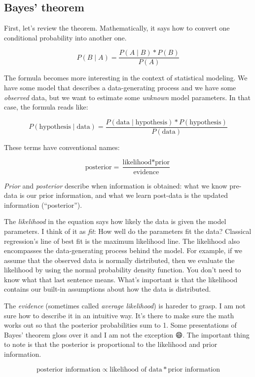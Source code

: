 \documentclass[
  12pt,
]{book}
\begin{document}
\hypertarget{bayes-theorem}{%
\subsection{Bayes' theorem}\label{bayes-theorem}}

First, let's review the theorem. Mathematically, it says how to convert one conditional probability into another one.

\[ P(B \mid A) = \frac{ P(A \mid B) * P(B)}{P(A)} \]

The formula becomes more interesting in the context of statistical modeling. We
have some model that describes a data-generating process and we have some
\emph{observed} data, but we want to estimate some \emph{unknown} model parameters.
In that case, the formula reads like:

\[ P(\text{hypothesis} \mid \text{data}) = \frac{ P(\text{data} \mid \text{hypothesis}) * P(\text{hypothesis})}{P(\text{data})} \]

These terms have conventional names:

\[ \text{posterior} = \frac{ \text{likelihood} * \text{prior}}{\text{evidence}} \]

\emph{Prior} and \emph{posterior} describe when information is obtained: what we know pre-data is our
prior information, and what we learn post-data is the updated information
(``posterior'').

The \emph{likelihood} in the equation says how likely the data is given the model
parameters. I think of it as \emph{fit}: How well do the parameters fit the data?
Classical regression's line of best fit is the maximum likelihood line. The
likelihood also encompasses the data-generating process behind the model. For
example, if we assume that the observed data is normally distributed, then we
evaluate the likelihood by using the normal probability density function. You
don't need to know what that last sentence means. What's important is that the
likelihood contains our built-in assumptions about how the data is distributed.

The \emph{evidence} (sometimes called \emph{average likelihood}) is hareder to grasp. I am not sure how to describe it in an intuitive way.
It's there to make sure the math works out so that the posterior probabilities sum to 1.
Some presentations of Bayes' theorem gloss over it and I am not the exception 😄.
The important thing to note is that the posterior is proportional to the
likelihood and prior information.

\[ 
\text{posterior information} \propto 
  \text{likelihood of data} * \text{prior information} 
\]
\end{document}
